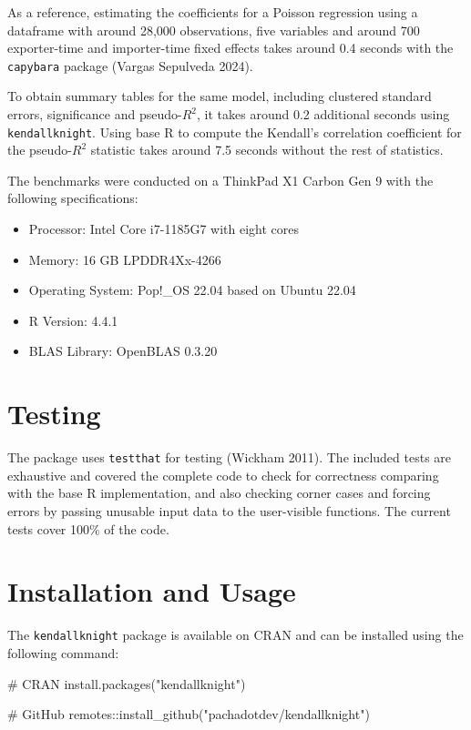 \documentclass[12pt]{article}
\providecommand{\tightlist}{\setlength{\itemsep}{0pt}\setlength{\parskip}{0pt}}
\newenvironment{Shaded}{\begin{snugshade}}{\end{snugshade}}
\newcommand{\CommentTok}[1]{\textcolor[rgb]{0.37,0.37,0.37}{#1}}
\newcommand{\FunctionTok}[1]{\textcolor[rgb]{0.28,0.35,0.67}{#1}}
\newcommand{\NormalTok}[1]{\textcolor[rgb]{0.00,0.23,0.31}{#1}}
\newcommand{\SpecialCharTok}[1]{\textcolor[rgb]{0.37,0.37,0.37}{#1}}
\newcommand{\StringTok}[1]{\textcolor[rgb]{0.13,0.47,0.30}{#1}}
\begin{document}
As a reference, estimating the coefficients for a Poisson regression
using a dataframe with around 28,000 observations, five variables and
around 700 exporter-time and importer-time fixed effects takes around
0.4 seconds with the \texttt{capybara} package (Vargas Sepulveda 2024).

To obtain summary tables for the same model, including clustered
standard errors, significance and pseudo-\(R^2\), it takes around 0.2
additional seconds using \texttt{kendallknight}. Using base R to compute
the Kendall's correlation coefficient for the pseudo-\(R^2\) statistic
takes around 7.5 seconds without the rest of statistics.

The benchmarks were conducted on a ThinkPad X1 Carbon Gen 9 with the
following specifications:

\begin{itemize}
\tightlist
\item
  Processor: Intel Core i7-1185G7 with eight cores
\item
  Memory: 16 GB LPDDR4Xx-4266
\item
  Operating System: Pop!\_OS 22.04 based on Ubuntu 22.04
\item
  R Version: 4.4.1
\item
  BLAS Library: OpenBLAS 0.3.20
\end{itemize}

\section{Testing}\label{testing}

The package uses \texttt{testthat} for testing (Wickham 2011). The
included tests are exhaustive and covered the complete code to check for
correctness comparing with the base R implementation, and also checking
corner cases and forcing errors by passing unusable input data to the
user-visible functions. The current tests cover 100\% of the code.

\section{Installation and Usage}\label{installation-and-usage}

The \texttt{kendallknight} package is available on CRAN and can be
installed using the following command:

\begin{Shaded}
\begin{Highlighting}[]
\CommentTok{\# CRAN}
\FunctionTok{install.packages}\NormalTok{(}\StringTok{"kendallknight"}\NormalTok{)}

\CommentTok{\# GitHub}
\NormalTok{remotes}\SpecialCharTok{::}\FunctionTok{install\_github}\NormalTok{(}\StringTok{"pachadotdev/kendallknight"}\NormalTok{)}
\end{Highlighting}
\end{Shaded}
\end{document}
